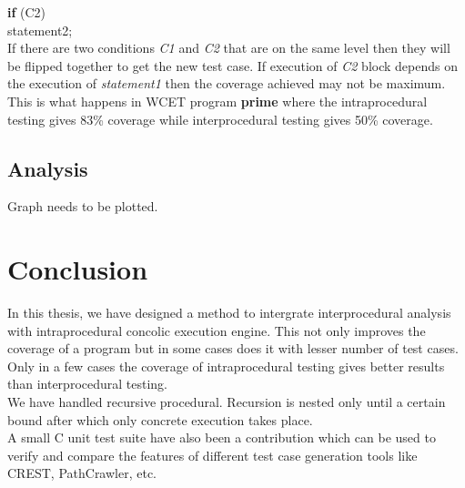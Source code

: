 \documentclass[12pt,oneside]{book}
\begin{document}
\vspace{-8mm}
\hspace{5cm}
\textbf{if} (C2)   \\

\vspace{-10mm}
\hspace{5.25cm} statement2;
\hspace{6cm}  \\

If there are two conditions \textit{C1} and \textit{C2} that are on the same level then they will be flipped together to get the new test case. If execution of \textit{C2} block depends on the execution of \textit{statement1} then the coverage achieved may not be maximum. This is what happens in WCET program \textbf{prime} where the intraprocedural testing gives 83\% coverage while interprocedural testing gives 50\% coverage.


\section{Analysis}
Graph needs to be plotted.













\chapter{Conclusion}
In this thesis, we have designed a method to intergrate interprocedural analysis with intraprocedural concolic execution engine. This not only improves the coverage of a program but in some cases does it with lesser number of test cases. Only in a few cases the coverage of intraprocedural testing gives better results than interprocedural testing.\\  
We have handled recursive procedural. Recursion is nested only until a certain bound after which only concrete execution takes place.\\
A small C unit test suite have also been a contribution which can be used to verify and compare the features of different test case generation tools like CREST\cite{crest}, PathCrawler\cite{pathcrawler}, etc.  











  
\end{document}
